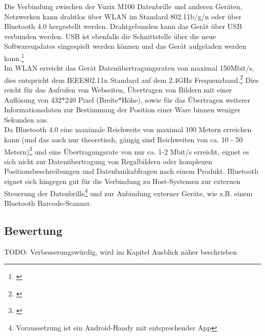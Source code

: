Die Verbindung zwischen der Vuzix M100 Datenbrille und anderen Geräten, Netzwerken kann drahtlos über WLAN im Standard 802.11b/g/n oder über Bluetooth 4.0 hergestellt werden. Drahtgebunden kann das Gerät über USB verbunden werden. \ac{USB} ist ebenfalls die Schnittstelle über die neue Softwareupdates eingespielt werden können und das Gerät aufgeladen werden kann.\footnote{\citep{vuzixm100}}\\
Im \ac{WLAN} erreicht das Gerät Datenübertragungsraten von maximal 150Mbit/s, dies entspricht dem IEEE802.11n Standard auf dem 2.4GHz Frequenzband.\footnote{\citep{uebertragungsgeschwindigkeit}} Dies reicht für das Aufrufen von Webseiten, Übertragen von Bildern mit einer Auflösung von 432*240 Pixel (Breite*Höhe), sowie für das Übertragen weiterer Informationsdaten zur Bestimmung der Position einer Ware binnen weniger Sekunden aus.\\
Da Bluetooth 4.0 eine maximale Reichweite von maximal 100 Metern erreichen kann (und das auch nur theoretisch, gängig sind Reichweiten von ca. 10 - 50 Metern)\footnote{\citep{bluetooth}} und eine Übertragungsrate von nur ca. 1-2 Mbit/s erreicht, eignet es sich nicht zur Datenübertragung von Regalbildern oder komplexen Positionsbeschreibungen und Datenbankabfragen nach einem Produkt. Bluetooth eignet sich hingegen gut für die Verbindung zu Host-Systemen zur externen Steuerung der Datenbrille\footnote{Voraussetzung ist ein Android-Handy mit entsprechender App} und zur Anbindung externer Geräte, wie z.B. einem Bluetooth Barcode-Scanner.

\subsection{Bewertung}

TODO: Verbesserungswürdig, wird im Kapitel Ausblick näher beschrieben